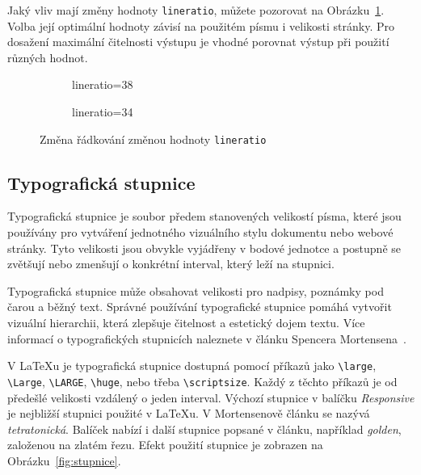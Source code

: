 \documentclass{csbulletin}
\newcommand\balicek[1]{\textit{#1}}
\begin{document}
Jaký vliv mají změny hodnoty \texttt{lineratio}, můžete pozorovat na Obrázku~\ref{fig:lineratio}. 
Volba její optimální hodnoty závisí na použitém písmu i velikosti stránky. 
Pro dosažení maximální čitelnosti výstupu je vhodné porovnat výstup 
při použití různých hodnot.



\begin{figure}[tbp]
  \begin{subfigure}[b]{0.45\textwidth}
\caption{lineratio=38}
\end{subfigure}
\begin{subfigure}[b]{0.45\textwidth}
\caption{lineratio=34}
\end{subfigure}
  \caption{Změna řádkování změnou hodnoty \texttt{lineratio}}\label{fig:lineratio}
\end{figure}

\subsection{Typografická stupnice}

Typografická stupnice je soubor předem stanovených velikostí písma, které jsou
používány pro vytváření jednotného vizuálního stylu dokumentu nebo webové
stránky. Tyto velikosti jsou obvykle vyjádřeny v bodové jednotce a postupně se
zvětšují nebo zmenšují o konkrétní interval, který leží na stupnici.

Typografická stupnice může obsahovat velikosti pro nadpisy, poznámky pod čarou a běžný
text. Správné používání typografické stupnice pomáhá vytvořit vizuální
hierarchii, která zlepšuje čitelnost a estetický dojem textu. 
Více informací o typografických stupnicích naleznete v článku Spencera
Mortensena~\cite{mortensen}. 

V \LaTeX u je typografická stupnice dostupná pomocí příkazů jako \verb|\large|,
\verb|\Large|, \verb|\LARGE|, \verb|\huge|, nebo třeba \verb|\scriptsize|.
Každý z těchto příkazů je od předešlé velikosti vzdálený o jeden interval.
Výchozí stupnice v balíčku \balicek{Responsive} je nejbližší stupnici použité
v \LaTeX u.  V Mortensenově článku se nazývá \textit{tetratonická}. Balíček
nabízí i další stupnice popsané v článku, například \textit{golden}, založenou
na zlatém řezu. Efekt použití stupnice je zobrazen na
Obrázku~\ref{fig:stupnice}.
\end{document}

